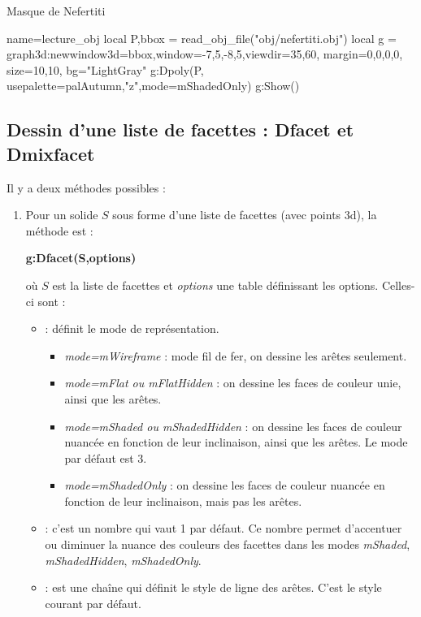 \begin{demo}{Masque de Nefertiti}
\begin{luadraw}{name=lecture_obj}
local P,bbox = read_obj_file("obj/nefertiti.obj")
local g = graph3d:new{window3d=bbox,window={-7,5,-8,5},viewdir={35,60},
    margin={0,0,0,0}, size={10,10}, bg="LightGray"}
g:Dpoly(P, {usepalette={palAutumn,"z"},mode=mShadedOnly})
g:Show() 
\end{luadraw}
\end{demo}


\subsection{Dessin d'une liste de facettes : Dfacet et Dmixfacet}

Il y a deux méthodes possibles :
\begin{enumerate}
    \item Pour un solide $S$ sous forme d'une liste de facettes (avec points 3d), la méthode est :
    \par\hfil\textbf{g:Dfacet(S,options)}\hfil\par
    où $S$ est la liste de facettes et \emph{options} une table définissant les options. Celles-ci sont :
\begin{itemize}
    \item {} : définit le mode de représentation.
        \begin{itemize}
            \item \emph{mode=mWireframe} : mode fil de fer, on dessine les arêtes seulement.
            \item \emph{mode=mFlat ou mFlatHidden} : on dessine les faces de couleur unie, ainsi que les arêtes.
            \item \emph{mode=mShaded ou mShadedHidden} : on dessine les faces de couleur nuancée en fonction de leur inclinaison, ainsi que les arêtes. Le mode par défaut est 3.
            \item \emph{mode=mShadedOnly} :  on dessine les faces de couleur nuancée en fonction de leur inclinaison, mais pas les arêtes.
        \end{itemize}
        \item {} : c'est un nombre qui vaut 1 par défaut. Ce nombre permet d'accentuer ou diminuer la nuance des couleurs des facettes dans les modes \emph{mShaded}, \emph{mShadedHidden}, \emph{mShadedOnly}.
        \item {} : est une chaîne qui définit le style de ligne des arêtes. C'est le style courant par défaut.

\end{itemize}
\end{enumerate}
